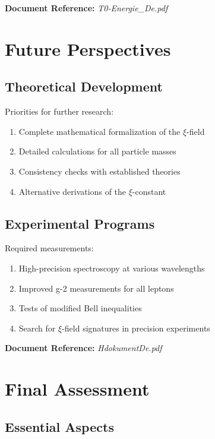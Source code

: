 \documentclass[12pt,a4paper]{article}
\newcommand{\xipar}{\xi}
\begin{document}
	\textbf{Document Reference:} \textit{T0-Energie\_De.pdf}
	
	\section{Future Perspectives}
	
	\subsection{Theoretical Development}
	
	Priorities for further research:
	
	\begin{enumerate}
		\item Complete mathematical formalization of the $\xipar$-field
		\item Detailed calculations for all particle masses
		\item Consistency checks with established theories
		\item Alternative derivations of the $\xipar$-constant
	\end{enumerate}
	
	\subsection{Experimental Programs}
	
	Required measurements:
	
	\begin{enumerate}
		\item High-precision spectroscopy at various wavelengths
		\item Improved g-2 measurements for all leptons
		\item Tests of modified Bell inequalities
		\item Search for $\xipar$-field signatures in precision experiments
	\end{enumerate}
	
	\textbf{Document Reference:} \textit{HdokumentDe.pdf}
	
	\section{Final Assessment}
	
	\subsection{Essential Aspects}
	
\end{document}
